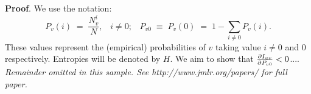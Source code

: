 \noindent
{\bf Proof}. We use the notation:
\[
P_v(i) \;=\;\frac{N_v^i}{N},\;\;\;i \neq 0;\;\;\;
P_{v0}\;\equiv\;P_v(0)\; = \;1 - \sum_{i\neq 0}P_v(i).
\]
These values represent the (empirical) probabilities of $v$
taking value $i\neq 0$ and 0 respectively.  Entropies will be denoted
by $H$. We aim to show that $\frac{\partial I_{uv}}{\partial P_{v0}} < 0$....\\

{\noindent \em Remainder omitted in this sample. See http://www.jmlr.org/papers/ for full paper.}


\vskip 0.2in



